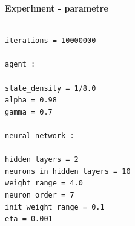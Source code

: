 \documentclass[xcolor=dvipsnames]{beamer}
\begin{document}
\begin{frame}[fragile]{\bf Experiment - parametre}

\begin{lstlisting}

iterations = 10000000

agent :

state_density = 1/8.0
alpha = 0.98
gamma = 0.7

neural network :

hidden layers = 2
neurons in hidden layers = 10
weight range = 4.0
neuron order = 7
init weight range = 0.1
eta = 0.001

\end{lstlisting}

\end{frame}
\end{document}
